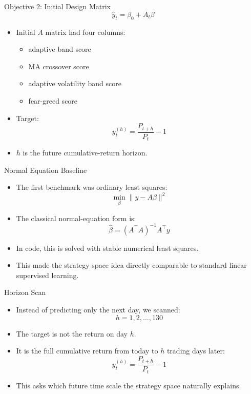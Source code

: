 \documentclass[aspectratio=169]{beamer}
\begin{document}
\begin{frame}{Objective 2: Initial Design Matrix}
  \[
    \hat{y}_t = \beta_0 + A_t \beta
  \]

  \begin{itemize}
    \item Initial \(A\) matrix had four columns:
    \begin{itemize}
      \item adaptive band score
      \item MA crossover score
      \item adaptive volatility band score
      \item fear-greed score
    \end{itemize}
    \item Target:
    \[
      y_t^{(h)} = \frac{P_{t+h}}{P_t} - 1
    \]
    \item \(h\) is the future cumulative-return horizon.
  \end{itemize}
\end{frame}

\begin{frame}{Normal Equation Baseline}
  \begin{itemize}
    \item The first benchmark was ordinary least squares:
    \[
      \min_{\beta} \|y - A\beta\|^2
    \]
    \item The classical normal-equation form is:
    \[
      \hat{\beta} = (A^\top A)^{-1}A^\top y
    \]
    \item In code, this is solved with stable numerical least squares.
    \item This made the strategy-space idea directly comparable to standard linear supervised learning.
  \end{itemize}
\end{frame}

\begin{frame}{Horizon Scan}
  \begin{itemize}
    \item Instead of predicting only the next day, we scanned:
    \[
      h = 1, 2, \dots, 130
    \]
    \item The target is not the return on day \(h\).
    \item It is the full cumulative return from today to \(h\) trading days later:
    \[
      y_t^{(h)} = \frac{P_{t+h}}{P_t} - 1
    \]
    \item This asks which future time scale the strategy space naturally explains.
  \end{itemize}
\end{frame}
\end{document}
